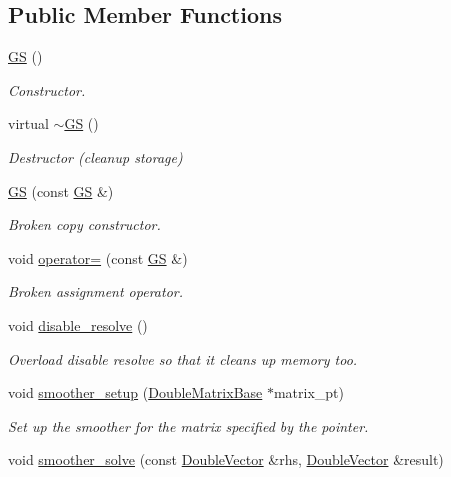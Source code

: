 \subsection*{Public Member Functions}
\begin{DoxyCompactItemize}
\item 
\hyperlink{classoomph_1_1GS_ab3817b7d1c6fc7c6307012dfc1b546b4}{GS} ()
\begin{DoxyCompactList}\small\item\em Constructor. \end{DoxyCompactList}\item 
virtual \hyperlink{classoomph_1_1GS_a23bc92ce372a160a9ac5fef91ec87cd4}{$\sim$\+GS} ()
\begin{DoxyCompactList}\small\item\em Destructor (cleanup storage) \end{DoxyCompactList}\item 
\hyperlink{classoomph_1_1GS_a0ca94fa6f508ed9560d7cf69082937f2}{GS} (const \hyperlink{classoomph_1_1GS}{GS} \&)
\begin{DoxyCompactList}\small\item\em Broken copy constructor. \end{DoxyCompactList}\item 
void \hyperlink{classoomph_1_1GS_af277c6797d99305c7195e40f93bab824}{operator=} (const \hyperlink{classoomph_1_1GS}{GS} \&)
\begin{DoxyCompactList}\small\item\em Broken assignment operator. \end{DoxyCompactList}\item 
void \hyperlink{classoomph_1_1GS_a9c3bfbebb6686c5f3ca650ef01697728}{disable\+\_\+resolve} ()
\begin{DoxyCompactList}\small\item\em Overload disable resolve so that it cleans up memory too. \end{DoxyCompactList}\item 
void \hyperlink{classoomph_1_1GS_a92a30b95c5ff0b2eefdc7730c822b6d5}{smoother\+\_\+setup} (\hyperlink{classoomph_1_1DoubleMatrixBase}{Double\+Matrix\+Base} $\ast$matrix\+\_\+pt)
\begin{DoxyCompactList}\small\item\em Set up the smoother for the matrix specified by the pointer. \end{DoxyCompactList}\item 
void \hyperlink{classoomph_1_1GS_a8707c2bcc7fcaceca2fe93ac471ed1a2}{smoother\+\_\+solve} (const \hyperlink{classoomph_1_1DoubleVector}{Double\+Vector} \&rhs, \hyperlink{classoomph_1_1DoubleVector}{Double\+Vector} \&result)

\end{DoxyCompactItemize}
